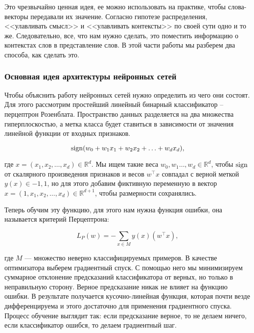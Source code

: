 Это чрезвычайно ценная идея, ее можно использовать на практике, чтобы слова-векторы передавали их значение. Согласно гипотезе распределения, <<улавливать смысл>> и <<улавливать контексты>> по своей сути одно и то же. Следовательно, все, что нам нужно сделать, это поместить информацию о контекстах слов в представление слов. В этой части работы мы разберем два способа, как сделать это.


\subsubsection{Основная идея архитектуры нейронных сетей}

Чтобы объяснить работу нейронных сетей нужно определить из чего они состоят. Для этого рассмотрим простейший линейный бинарный классификатор -- перцептрон Розенблата. Пространство данных разделяется на два множества гиперплоскостью, а метка класса будет ставиться в зависимости от значения линейной функции от входных признаков.

\begin{equation}
 \operatorname*{sign} (w_0 + w_1x_1 + w_2x_2 + \ldots + w_dx_d),
\end{equation}

где $x =(x_1, x_2, \ldots, x_d) \in \mathds{R}^d$. Мы ищем такие веса $w_0, w_1 \ldots, w_d \in \mathds{R}^d$, чтобы $\operatorname*{sign}$ от скалярного произведения признаков и весов $w^\top x$ совпадал с верной меткой $y(x) \in {-1,1}$, но для этого добавим фиктивную переменную в вектор $x =(1, x_1, x_2, \ldots, x_d) \in \mathds{R}^{d+1}$, чтобы размерности сохранялись.

\bigskip
Теперь обучим эту функцию, для этого нам нужна функция ошибки, она называется критерий Перцептрона:

\begin{equation}
 L_P(w) = - \sum_{x \in M} y(x)(w^\top x),
\end{equation}

где $M$ --- множество неверно классифицируемых примеров. В качестве оптимизатора выберем градиентный спуск. С помощью него мы минимизируем суммарное отклонение предсказаний классификатора от верных, но только в неправильную сторону. Верное предсказание никак не влияет на функцию ошибки. В результате получается кусочно-линейная функция, которая почти везде дифференцируема и этого достаточно для применения градиентного спуска. Процесс обучение выглядит так: если предсказание верное, то не делаем ничего, если классификатор ошибся, то делаем градиентный шаг.

